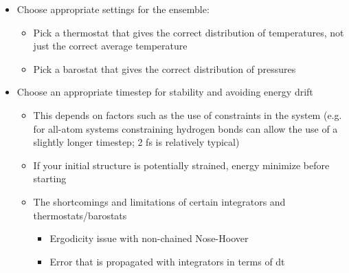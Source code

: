 \documentclass[9pt,bestpractices]{livecoms}
\begin{document}
\begin{itemize}
\begin{itemize}
\end{itemize}
\item Choose appropriate settings for the ensemble:
\begin{itemize}
\item Pick a thermostat that gives the correct distribution of temperatures, not just the correct average temperature
\item Pick a barostat that gives the correct distribution of pressures
\end{itemize}
\item Choose an appropriate timestep for stability and avoiding energy drift
\begin{itemize}
\item This depends on factors such as the use of constraints in the system (e.g. for all-atom systems constraining hydrogen bonds can allow the use of a slightly longer timestep; 2 fs is relatively typical)
\item If your initial structure is potentially strained, energy minimize before starting
\item The shortcomings and limitations of certain integrators and thermostats/barostats
\begin{itemize}
\item Ergodicity issue with non-chained Nose-Hoover
\item Error that is propagated with integrators in terms of dt
\end{itemize}
\end{itemize}
\end{itemize}






\nocite{*}
{}
\end{document}
